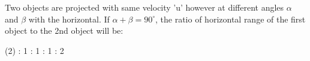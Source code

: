 \item Two objects are projected with same velocity 'u' however at different angles \(\alpha\) and \(\beta\) with the horizontal. If \(\alpha + \beta = 90^\circ\), the ratio of horizontal range of the first object to the 2nd object will be:
    \begin{tasks}(2)
         : 1
         : 1
         : 1
         : 2
    \end{tasks}